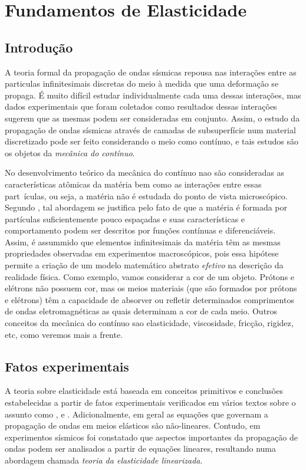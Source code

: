 \chapter{Fundamentos de Elasticidade}\label{sec.fund_elast}

\section{Introdu\c{c}\~ao}
A teoria formal da propaga\c{c}\~ao de ondas s\'ismicas repousa nas intera\c{c}\~oes entre as particulas infinitesimais discretas do meio \`a medida que uma deforma\c{c}\~ao se propaga. \'E muito dif\'icil estudar individualmente cada uma dessas intera\c{c}\~oes, mas dados experimentais que foram coletados como resultados dessas intera\c{c}\~oes sugerem que as mesmas podem ser consideradas em conjunto. Assim, o estudo da propaga\c{c}\~ao de ondas s\'ismicas atrav\'es de camadas de subsuperf\'icie num material discretizado pode ser feito considerando o meio como cont\'inuo, e tais estudos s\~ao os objetos da \textit{mec\^anica do cont\'inuo}. 

No desenvolvimento te\'orico da mec\^anica do cont\'inuo nao s\~ao consideradas as caracter\'isticas at\^omicas da mat\'eria bem como as intera\c{c}\~oes entre essas part~\'iculas, ou seja, a mat\'eria n\~ao \'e estudada do ponto de vista microsc\'opico. Segundo \cite{slawinski}, tal abordagem se justifica pelo fato de que a mat\'eria \'e formada por part\'iculas suficientemente pouco espa\c{c}adas e suas caracter\'isticas e comportamento podem ser descritos por fun\c{c}\~oes cont\'inuas e diferenci\'aveis. Assim, \'e assummido que elementos infinitesimais da mat\'eria t\^em as mesmas propriedades observadas em experimentos macrosc\'opicos, pois essa hip\'otese permite a cria\c{c}\~ao de um modelo matem\'atico abstrato \textit{efetivo} na descri\c{c}\~ao da realidade f\'isica. Como exemplo, vamos considerar a cor de um objeto. Pr\'otons e el\'etrons n\~ao possuem cor, mas os meios materiais (que s\~ao formados por pr\'otons e el\'etrons) t\^em a capacidade de absorver ou refletir determinados comprimentos de ondas eletromagn\'eticas as quais determinam a cor de cada meio. Outros conceitos da mec\^anica do cont\'inuo sao elasticidade, viscosidade, fric\c{c}\~ao, rigidez, etc, como veremos mais a frente.


\section{Fatos experimentais}
A teoria sobre elasticidade est\'a baseada em conceitos primitivos e conclus\~oes estabelecidas a partir de fatos experimentais verificados em v\'arios textos sobre o assunto como \cite{liu}, \cite{dahlem} e \cite{slawinski}. Adicionalmente, em geral as equa\c{c}\~oes que governam a propaga\c{c}\~ao de ondas em meios el\'asticos s\~ao n\~ao-lineares. Contudo, em experimentos s\'ismicos foi constatado que aspectos importantes da propaga\c{c}\~ao de ondas podem ser analisados a partir de equa\c{c}\~oes lineares, resultando numa abordagem chamada \textit{teoria da elasticidade linearizada}.

